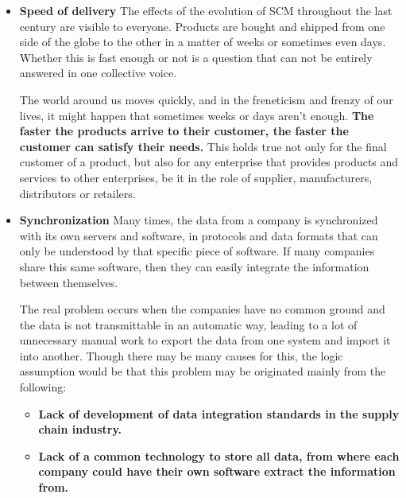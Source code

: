 \begin{itemize}
\item \textbf{Speed of delivery}
The effects of the evolution of SCM throughout the last century are visible to everyone. Products are bought and shipped from one side of the globe to the other in a matter of weeks or sometimes even days. Whether this is fast enough or not is a question that can not be entirely answered in one collective voice. 

The world around us moves quickly, and in the freneticism and frenzy of our lives, it might happen that sometimes weeks or days aren't enough.  \textbf{The faster the products arrive to their customer, the faster the customer can satisfy their needs.}  This holds true not only for the final customer of a product, but also for any enterprise that provides products and services to other enterprises, be it in the role of supplier, manufacturers, distributors or retailers. 

\item \textbf{Synchronization}
Many times, the data from a company is synchronized with its own servers and software, in protocols and data formats that can only be understood by that specific piece of software. If many companies share this same software, then they can easily integrate the information between themselves.

The real problem occurs when the companies have no common ground and the data is not transmittable in an automatic way, leading to a lot of unnecessary manual work to export the data from one system and import it into another. Though there may be many causes for this, the logic assumption would be that this problem may be originated mainly from the following:

\begin{itemize}
\item \textbf{Lack of development of data integration standards in the supply chain industry.}
\item \textbf{Lack of a common technology to store all data, from where each company could have their own software extract the information from.}
\end{itemize}


\end{itemize}
